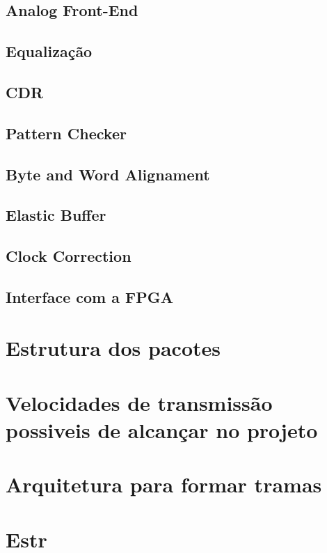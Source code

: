 \subsection{Analog Front-End}	
	
\subsection{Equalização}

\subsection{CDR}

\subsection{Pattern Checker}

\subsection{Byte and Word Alignament}

\subsection{Elastic Buffer}

\subsection{Clock Correction}

\subsection{Interface com a FPGA}
	
\section{Estrutura dos pacotes}

\section{Velocidades de transmissão possiveis de alcançar no projeto}

\section{Arquitetura para formar tramas}

\section{Estr}

